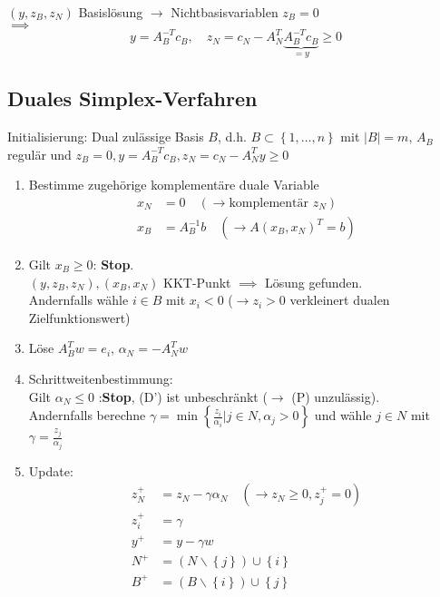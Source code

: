 $(y,z_{B},z_{N})$ Basislösung $\to$ Nichtbasisvariablen $z_{B} =0$ \\
$\implies$ 
\begin{equation*}
	y = A_{B}^{-T}c_{B}, \quad z_{N}= c_{N}- A_{N}^{T} \underbrace{A_{B}^{-T}c_{B}}_{{=y}}\geq 0  
\end{equation*}
\subsection{Duales Simplex-Verfahren}
Initialisierung: Dual zulässige Basis $B$, d.h. $B \subset \left\{1,\dots ,n \right\}$ mit $|B|=m$, $A_{B}$ regulär und $z_{B}=0,y=A_{B}^{-T}c_{B}, z_{N}= c_{N}-A_{N}^{T}y \geq 0$ 
\begin{enumerate}%
	\item Bestimme zugehörige komplementäre duale Variable
		\begin{align*}
			x_{N}&=0 \quad (\to \text{komplementär }z_{N})\\
			x_{B}&= A_{B}^{-1} b\quad ( \to A(x_{B},x_{N})^{T} =b)
		\end{align*}
	\item Gilt $x_{B} \geq 0 $: \textbf{Stop}.\\
		$(y,z_{B},z_{N}),(x_{B},x_{N})$ KKT-Punkt $\implies$ Lösung gefunden.\\
		Andernfalls wähle $ i \in B$ mit $x_{i}<0$ ($\to z_{i}>0$ verkleinert dualen Zielfunktionswert)
	\item Löse $A_{B}^{T} w = e_{i}$, $\alpha_{N} = -A_{N}^{T} w$ 
	\item Schrittweitenbestimmung:\\
		Gilt $\alpha_{N} \leq 0 $ :\textbf{Stop}, (D') ist unbeschränkt ($\to$ (P) unzulässig).\\
		Andernfalls berechne $\gamma = \min \left\{ \frac{z_{i}}{\alpha_{i}}|j \in N , \alpha_{j} >0 \right\}$ und wähle $j \in N$ mit $\gamma = \frac{z_{j}}{\alpha_{j}}$
	\item Update:
		\begin{align*}
			z_{N}^+ &= z_{N} - \gamma \alpha_{N} \quad (\to z_{N} \geq 0, z_{j}^+ =0)\\
			z_{i}^+ &= \gamma\\
			y^+ &= y -\gamma w\\
			N^+ &= (N \backslash \left\{ j \right\}) \cup \left\{ i \right\}\\
			B^+ &= (B \backslash \left\{ i \right\}) \cup \left\{ j \right\}
		\end{align*}
\end{enumerate}


